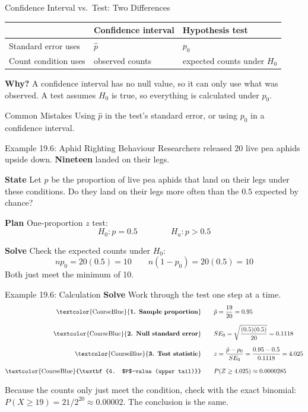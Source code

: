 \documentclass[aspectratio=169,10pt]{beamer}
\newcommand{\step}[1]{\textcolor{CourseBlue}{\textbf{#1}}\quad}
\newcommand{\calc}[1]{\textcolor{CourseBlue}{\textbf{#1}}}
\begin{document}
\begin{frame}{Confidence Interval vs.\ Test: Two Differences}
\begin{center}
\begin{tabularx}{0.86\textwidth}{>{\RaggedRight\arraybackslash}p{} X X}
\toprule
 & \textbf{Confidence interval} & \textbf{Hypothesis test} \\
\midrule
Standard error uses & $\hat{p}$ & $p_0$ \\[0.15cm]
Count condition uses & observed counts & expected counts under $H_0$ \\
\bottomrule
\end{tabularx}
\end{center}

\vspace{0.3cm}
\textbf{Why?} A confidence interval has no null value, so it can only use what was observed. A test assumes $H_0$ is true, so everything is calculated under $p_0$.

\vspace{0.3cm}
\begin{block}{Common Mistakes}
Using $\hat{p}$ in the test's standard error, or using $p_0$ in a confidence interval.
\end{block}
\end{frame}

\begin{frame}{Example 19.6: Aphid Righting Behaviour}
Researchers released $20$ live pea aphids upside down. \textbf{Nineteen} landed on their legs.

\vspace{0.2cm}
\step{State} Let $p$ be the proportion of live pea aphids that land on their legs under these conditions. Do they land on their legs more often than the $0.5$ expected by chance?

\vspace{0.2cm}
\step{Plan} One-proportion $z$ test:
\[
H_0:p=0.5\qquad\qquad H_a:p>0.5
\]

\step{Solve} Check the expected counts under $H_0$:
\[
np_0=20(0.5)=10\qquad n(1-p_0)=20(0.5)=10
\]
Both just meet the minimum of 10.
\end{frame}

\begin{frame}{Example 19.6: Calculation}
\step{Solve} Work through the test one step at a time.
\begin{align*}
\text{\calc{1. Sample proportion}} \qquad & \hat{p}=\frac{19}{20}=0.95 \\[0.25cm]
\text{\calc{2. Null standard error}} \qquad & SE_0=\sqrt{\frac{(0.5)(0.5)}{20}}=0.1118 \\[0.25cm]
\text{\calc{3. Test statistic}} \qquad & z=\frac{\hat{p}-p_0}{SE_0}=\frac{0.95-0.5}{0.1118}=4.025 \\[0.25cm]
\text{\calc{4. $P$-value (upper tail)}} \qquad & P(Z\ge4.025)\approx0.0000285
\end{align*}

\vspace{0.2cm}
Because the counts only just meet the condition, check with the exact binomial: $P(X\ge19)=21/2^{20}\approx0.00002$. The conclusion is the same.
\end{frame}
\end{document}
